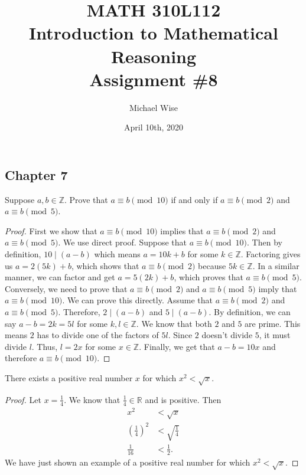 \documentclass[12pt]{article}
\title{MATH 310L112\\
       Introduction to Mathematical Reasoning\\
       Assignment \#8}
\author{Michael Wise}
\date{April 10th, 2020}
\begin{document}
\maketitle
\begin{description}
\section*{Chapter 7}
\item[Exercise 8:] Suppose $a,b \in \mathbb{Z}$. Prove that $a \equiv b\pmod{10}$ if and only if $a \equiv b\pmod{2}$ and $a \equiv b\pmod{5}$.
\begin{spacing}{2}
\begin{proof}
First we show that $a \equiv b\pmod{10}$ implies that $a \equiv b\pmod{2}$ and $a \equiv b\pmod{5}$. We use direct proof. Suppose that $a \equiv b\pmod{10}$. Then by definition, $10 \mid (a - b)$ which means $a = 10k + b$ for some $k \in \mathbb{Z}$. Factoring gives us $a = 2(5k) + b$, which shows that  $a \equiv b\pmod{2}$ because $5k \in \mathbb{Z}$. In a similar manner, we can factor and get $a = 5(2k) + b$, which proves that $a \equiv b\pmod{5}$.
\newline
Conversely, we need to prove that $a \equiv b\pmod{2}$ and $a \equiv b\pmod{5}$ imply that $a \equiv b\pmod{10}$. We can prove this directly. Assume that $a \equiv b\pmod{2}$ and $a \equiv b\pmod{5}$. Therefore, $2 \mid (a - b)$ and $5 \mid (a - b)$. By definition, we can say $a - b = 2k = 5l$ for some $k,l \in \mathbb{Z}$. We know that both $2$ and $5$ are prime. This means $2$ has to divide one of the factors of $5l$. Since $2$ doesn't divide $5$, it must divide $l$. Thus, $l = 2x$ for some $x \in \mathbb{Z}$. Finally, we get that $a-b = 10x$ and therefore $a \equiv b\pmod{10}$.
\end{proof}
\end{spacing}
\item[Exercise 12:] There exists a positive real number $x$ for which $x^2 < \sqrt{x}$.

\begin{spacing}{2}
\begin{proof}
Let $x = \frac{1}{4}$. We know that $\frac{1}{4} \in \mathbb{R}$ and is positive. Then
\begin{align*}
x^2 &< \sqrt{x} \\
\left(\frac{1}{4}\right)^2 &< \sqrt{\frac{1}{4}} \\
\frac{1}{16} &< \frac{1}{2}.
\end{align*}
We have just shown an example of a positive real number for which $x^2 < \sqrt{x}$.
\end{proof}
\end{spacing} 

\end{description}
\end{document}
